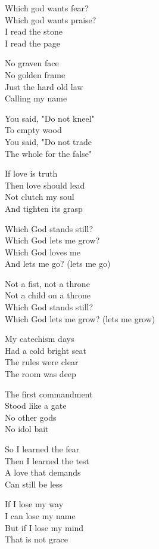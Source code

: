 \begin{lyrics}
Which god wants fear?\\
Which god wants praise?\\
I read the stone\\
I read the page

No graven face\\
No golden frame\\
Just the hard old law\\
Calling my name

You said, "Do not kneel"\\
To empty wood\\
You said, "Do not trade\\
The whole for the false"

If love is truth\\
Then love should lead\\
Not clutch my soul\\
And tighten its grasp

Which God stands still?\\
Which God lets me grow?\\
Which God loves me\\
And lets me go? (lets me go)

Not a fist, not a throne\\
Not a child on a throne\\
Which God stands still?\\
Which God lets me grow? (lets me grow)

My catechism days\\
Had a cold bright seat\\
The rules were clear\\
The room was deep

The first commandment\\
Stood like a gate\\
No other gods\\
No idol bait

So I learned the fear\\
Then I learned the test\\
A love that demands\\
Can still be less

If I lose my way\\
I can lose my name\\
But if I lose my mind\\
That is not grace


\end{lyrics}
